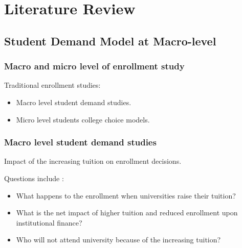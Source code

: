 \documentclass[aspectratio=169]{beamer}
\begin{document}
\section{Literature Review}
\subsection{Student Demand Model at Macro-level}


\begin{frame}
  \frametitle{Macro and micro level of enrollment study}
  Traditional enrollment studies:
  \begin{itemize}
    \item Macro level student demand studies.
    \item Micro level students college choice models.
  \end{itemize}
  
  
\end{frame}

\begin{frame}
  \frametitle{Macro level student demand studies}
  Impact of the increasing tuition on enrollment decisions.
  
  Questions include \citep{Leslie1987,  Leslie1988, Heller1997,
                          Ehrenberg2004, Crouse2015}:
  
 \begin{itemize}
   \item What happens to the enrollment when universities raise 
   their tuition?
  \item What is the net impact of higher tuition and reduced enrollment 
  upon institutional finance?
  \item Who will not attend university because of the increasing tuition?


 \end{itemize}
 
\end{frame}
\end{document}
